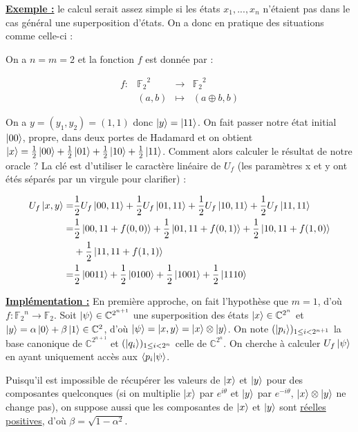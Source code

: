 \documentclass[french]{article}
\newcommand{\exemple}{\textbf{\underline{Exemple :} }}
\newcommand{\fonction}[5]{\begin{array}{l|rcl}
#1: & #2 & \longrightarrow & #3 \\
    & #4 & \longmapsto & #5 \end{array}}
\begin{document}
\noindent \exemple le calcul serait assez simple si les états $x_1, ..., x_n$ n'étaient pas dans le cas général une superposition d'états. On a donc en pratique des situations comme celle-ci :

On a $n = m = 2$ et la fonction $f$ est donnée par :

$$\fonction{f}{{\mathbb{F}_2}^2}{{\mathbb{F}_2}^2}{(a, b)}{(a \oplus b, b)}$$

On a $y = (y_1, y_2) = (1, 1)$ donc $\ket y = \ket{11}$. On fait passer notre état initial $\ket{00}$, propre, dans deux portes de Hadamard et on obtient $\ket{x} = \frac{1}{2}\ket{00} + \frac{1}{2}\ket{01} + \frac{1}{2} \ket{10} + \frac{1}{2} \ket{11}$.
Comment alors calculer le résultat de notre oracle ? La clé est d'utiliser le caractère linéaire de $U_f$ (les paramètres x et y ont étés séparés par un virgule pour clarifier) :

\begin{equation*}
\begin{split}
    U_f \ket{x, y} =& \frac{1}{2} U_f \ket{00,11} + \frac{1}{2} U_f \ket{01,11} + \frac{1}{2} U_f \ket{10,11} + \frac{1}{2} U_f \ket{11,11} \\
    =& \frac{1}{2} \ket{00,11 + f(0,0)} + \frac{1}{2} \ket{01, 11 + f(0,1)} + \frac{1}{2} \ket{10,11 + f(1,0)} \\
    & + \frac{1}{2} \ket{11, 11 + f(1,1)} \\
    =& \frac{1}{2} \ket{0011} + \frac{1}{2} \ket{0100} + \frac{1}{2} \ket{1001} + \frac{1}{2} \ket{1110}
\end{split}
\end{equation*}


\noindent \underline{\textbf{Implémentation :}} En première approche, on fait l'hypothèse que $m = 1$, d'où $f : {\mathbb{F}_2}^n \rightarrow \mathbb{F}_2$.
Soit $\ket \psi \in \mathbb{C}^{2^{n+1}}$ une superposition des états $\ket x \in \mathbb{C}^{2^n}$ et $\ket y = \alpha \ket 0 + \beta \ket 1 \in \mathbb{C}^{2}$, d'où $\ket \psi = \ket{x, y} = \ket x \otimes \ket y$.
On note $(\ket{p_i})_{1 \le i < 2^{n+1}}$ la base canonique de $\mathbb{C}^{2^{n+1}}$ et $(\ket{q_i})_{1 \le i < 2^n}$ celle de $\mathbb{C}^{2^n}$.
On cherche à calculer $U_f \ket \psi$ en ayant uniquement accès aux $\bra{p_i} \ket{\psi}$.


Puisqu'il est impossible de récupérer les valeurs de $\ket x$ et $\ket y$ pour des composantes quelconques (si on multiplie $\ket x$ par $e^{i\theta}$ et $\ket y$ par $e^{-i\theta}$, $\ket x \otimes \ket y$ ne change pas), on suppose aussi que les composantes de $\ket x$ et $\ket y$ sont \underline{réelles positives}, d'où $\beta = \sqrt{1 - \alpha^2}$.
\end{document}

